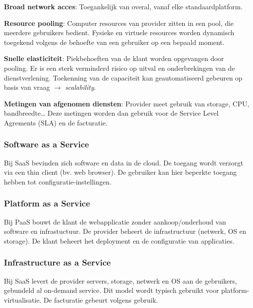 \documentclass[a4paper,12pt]{article}
\begin{document}
\textbf{Broad network acces}: Toegankelijk van overal, vanaf elke standaardplatform.

\textbf{Resource pooling}: Computer resources van provider zitten in een pool, die meerdere gebruikers bedient.
Fysieke en virtuele resources worden dynamisch toegekend volgens de behoefte van een gebruiker op een bepaald moment.

\textbf{Snelle elasticiteit}: Piekbehoeften van de klant worden opgevangen door pooling.
Er is een sterk verminderd risico op uitval en onderbrekingen van de dienstverlening.
Toekenning van de capaciteit kan geautomatiseerd gebeuren op basis van vraag $\rightarrow$ \textit{scalability}.

\textbf{Metingen van afgenomen diensten}: Provider meet gebruik van storage, CPU, bandbreedte\dots
Deze metingen worden dan gebruik voor de Service Level Agrements (SLA) en de facturatie.

\subsubsection{Software as a Service}
Bij SaaS bevinden zich software en data in de cloud.
De toegang wordt verzorgt via een thin client (bv. web browser).
De gebruiker kan hier beperkte toegang hebben tot configuratie-instellingen.

\subsubsection{Platform as a Service}
Bij PaaS bouwt de klant de webapplicatie zonder aankoop/onderhoud van software en infrastuctuur.
De provider beheert de infrastructuur (netwerk, OS en storage).
De klant beheert het deployment en de configuratie van applicaties.

\subsubsection{Infrastructure as a Service}
Bij SaaS levert de provider servers, storage, netwerk en OS aan de gebruikers, gebundeld al on-demand service.
Dit model wordt typisch gebruikt voor platform-virtualisatie.
De facturatie gebeurt volgens gebruik.
\end{document}

